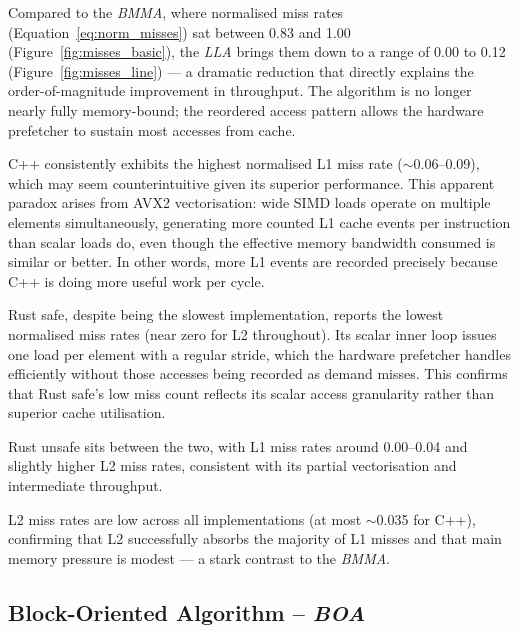 \documentclass[12pt,a4paper]{article}
\begin{document}
Compared to the \textit{BMMA}, where normalised miss rates (Equation~\ref{eq:norm_misses}) sat between 0.83
and 1.00 (Figure~\ref{fig:misses_basic}), the \textit{LLA} brings them down to a range of 0.00 to 0.12
(Figure~\ref{fig:misses_line}) ---
a dramatic reduction that directly explains the order-of-magnitude improvement
in throughput. The algorithm is no longer nearly fully memory-bound; the
reordered access pattern allows the hardware prefetcher to sustain most
accesses from cache.

C++ consistently exhibits the highest normalised L1 miss rate
($\sim$0.06--0.09), which may seem counterintuitive given its superior
performance. This apparent paradox arises from AVX2 vectorisation: wide SIMD
loads operate on multiple elements simultaneously, generating more counted L1
cache events per instruction than scalar loads do, even though the effective
memory bandwidth consumed is similar or better. In other words, more L1 events
are recorded precisely because C++ is doing more useful work per cycle.

Rust safe, despite being the slowest implementation, reports the lowest
normalised miss rates (near zero for L2 throughout). Its scalar inner loop
issues one load per element with a regular stride, which the hardware
prefetcher handles efficiently without those accesses being recorded as demand
misses. This confirms that Rust safe's low miss count reflects its scalar
access granularity rather than superior cache utilisation.

Rust unsafe sits between the two, with L1 miss rates around 0.00--0.04 and
slightly higher L2 miss rates, consistent with its partial vectorisation and
intermediate throughput.

L2 miss rates are low across all implementations (at most $\sim$0.035 for
C++), confirming that L2 successfully absorbs the majority of L1 misses and
that main memory pressure is modest --- a stark contrast to the \textit{BMMA}.

\subsection{Block-Oriented Algorithm -- \textit{BOA}}
\label{subsec:res_block}
\end{document}
